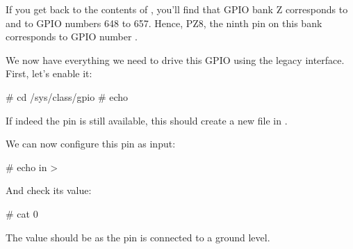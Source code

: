 If you get back to the contents of , you'll
find that GPIO bank Z corresponds to  and to GPIO
numbers 648 to 657. Hence, PZ8, the ninth pin on this bank corresponds to
GPIO number \gpionum.

We now have everything we need to drive this GPIO using the legacy
interface. First, let's enable it:

\begin{bashinput}
# cd /sys/class/gpio
# echo %
\end{bashinput}

If indeed the pin is still available, this should create a new
 file in .

We can now configure this pin as input:

\begin{bashinput}
# echo in > %
\end{bashinput}

And check its value:

\begin{bashinput}
# cat %
0
\end{bashinput}

The value should be  as the pin is connected to a ground level.

